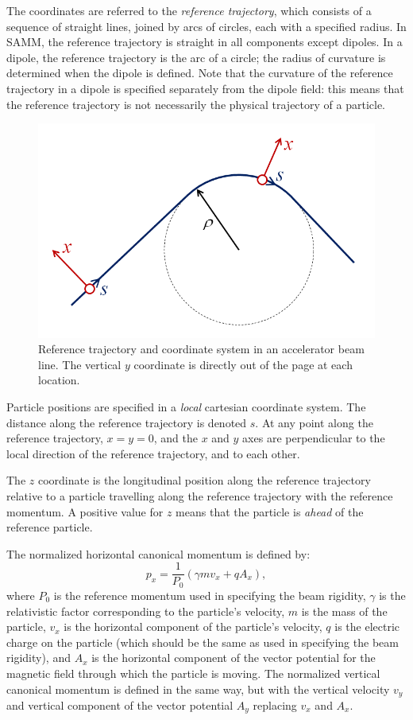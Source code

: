 \documentclass[11pt,twoside,a4paper]{article}
\begin{document}
The coordinates are referred to the \emph{reference trajectory}, which consists
of a sequence of straight lines, joined by arcs of circles, each with a specified
radius.  In SAMM, the reference trajectory is straight in all components except
dipoles.  In a dipole, the reference trajectory is the arc of a circle; the
radius of curvature is determined when the dipole is defined.  Note that the curvature
of the reference trajectory in a dipole is specified separately from the dipole
field: this means that the reference trajectory is not necessarily the physical
trajectory of a particle.

\begin{center}
\begin{figure}
\includegraphics[width=0.8\columnwidth]{ReferenceTrajectory.png}
\caption{Reference trajectory and coordinate system in an accelerator beam line.
The vertical $y$ coordinate is directly out of the page at each location.
\label{fig:referencetrajectory}}
\end{figure}
\end{center}

Particle positions are specified in a \emph{local} cartesian coordinate system.
The distance along the reference trajectory is denoted $s$.  At any point
along the reference trajectory, $x = y = 0$, and the $x$ and $y$ axes are perpendicular
to the local direction of the reference trajectory, and to each other.

The $z$ coordinate is the longitudinal position along the reference trajectory
relative to a particle travelling along the reference trajectory with the
reference momentum.  A positive value for $z$ means that the particle is
\emph{ahead} of the reference particle.

The normalized horizontal canonical momentum is defined by:
\[
p_x = \frac{1}{P_0} \left( \gamma m v_x + qA_x \right),
\]
where $P_0$ is the reference momentum used in specifying the beam rigidity,
$\gamma$ is the relativistic factor corresponding to the particle's velocity,
$m$ is the mass of the particle, $v_x$ is the horizontal component of the
particle's velocity, $q$ is the electric charge on the particle (which should
be the same as used in specifying the beam rigidity), and $A_x$ is the horizontal
component of the vector potential for the magnetic field through which the
particle is moving.  The normalized vertical canonical momentum is defined in
the same way, but with the vertical velocity $v_y$ and vertical component
of the vector potential $A_y$ replacing $v_x$ and $A_x$.
\end{document}
